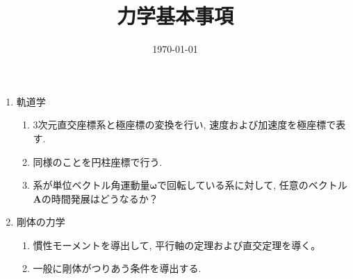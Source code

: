 \documentclass[11pt,a4paper]{jarticle}
\title{力学基本事項}
\author{}
\date{\today}
\begin{document}
\maketitle
\begin{enumerate}
    \item 軌道学
    \begin{enumerate}
        \item 3次元直交座標系と極座標の変換を行い, 速度および加速度を極座標で表す.
        \item 同様のことを円柱座標で行う.
        \item 系が単位ベクトル角運動量$\bm{ω}$で回転している系に対して, 任意のベクトル$\bm{A}$の時間発展はどうなるか？
    \end{enumerate}
    \item 剛体の力学
    \begin{enumerate}
        \item 慣性モーメントを導出して, 平行軸の定理および直交定理を導く。
        \item 一般に剛体がつりあう条件を導出する.
    \end{enumerate}
\end{enumerate}
\end{document}
